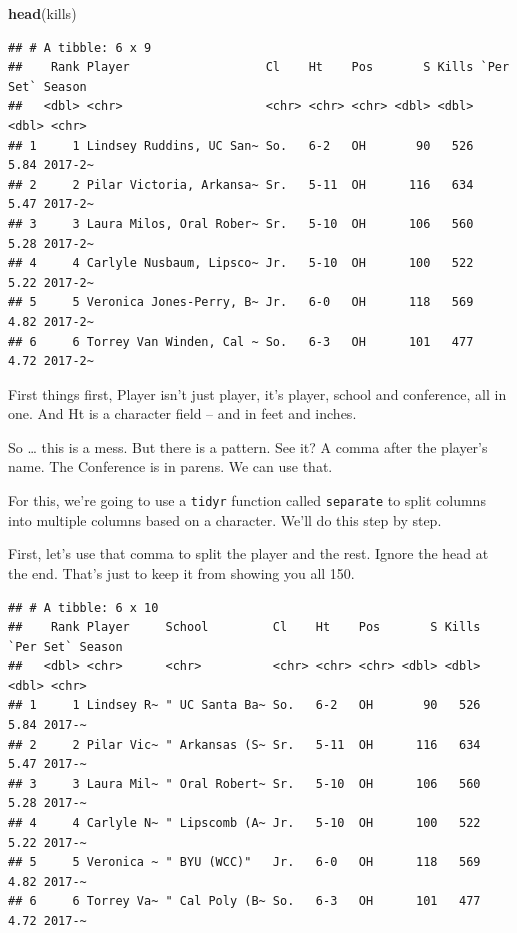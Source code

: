 \documentclass[]{book}
\newenvironment{Shaded}{\begin{snugshade}}{\end{snugshade}}
\newcommand{\DataTypeTok}[1]{\textcolor[rgb]{0.13,0.29,0.53}{#1}}
\newcommand{\KeywordTok}[1]{\textcolor[rgb]{0.13,0.29,0.53}{\textbf{#1}}}
\newcommand{\NormalTok}[1]{#1}
\newcommand{\OperatorTok}[1]{\textcolor[rgb]{0.81,0.36,0.00}{\textbf{#1}}}
\newcommand{\StringTok}[1]{\textcolor[rgb]{0.31,0.60,0.02}{#1}}
\begin{document}
\begin{Shaded}
\begin{Highlighting}[]
\KeywordTok{head}\NormalTok{(kills)}
\end{Highlighting}
\end{Shaded}

\begin{verbatim}
## # A tibble: 6 x 9
##    Rank Player                   Cl    Ht    Pos       S Kills `Per Set` Season 
##   <dbl> <chr>                    <chr> <chr> <chr> <dbl> <dbl>     <dbl> <chr>  
## 1     1 Lindsey Ruddins, UC San~ So.   6-2   OH       90   526      5.84 2017-2~
## 2     2 Pilar Victoria, Arkansa~ Sr.   5-11  OH      116   634      5.47 2017-2~
## 3     3 Laura Milos, Oral Rober~ Sr.   5-10  OH      106   560      5.28 2017-2~
## 4     4 Carlyle Nusbaum, Lipsco~ Jr.   5-10  OH      100   522      5.22 2017-2~
## 5     5 Veronica Jones-Perry, B~ Jr.   6-0   OH      118   569      4.82 2017-2~
## 6     6 Torrey Van Winden, Cal ~ So.   6-3   OH      101   477      4.72 2017-2~
\end{verbatim}

First things first, Player isn't just player, it's player, school and conference, all in one. And Ht is a character field -- and in feet and inches.

So \ldots{} this is a mess. But there is a pattern. See it? A comma after the player's name. The Conference is in parens. We can use that.

For this, we're going to use a \texttt{tidyr} function called \texttt{separate} to split columns into multiple columns based on a character. We'll do this step by step.

First, let's use that comma to split the player and the rest. Ignore the head at the end. That's just to keep it from showing you all 150.

\begin{Shaded}
\end{Shaded}

\begin{verbatim}
## # A tibble: 6 x 10
##    Rank Player     School         Cl    Ht    Pos       S Kills `Per Set` Season
##   <dbl> <chr>      <chr>          <chr> <chr> <chr> <dbl> <dbl>     <dbl> <chr> 
## 1     1 Lindsey R~ " UC Santa Ba~ So.   6-2   OH       90   526      5.84 2017-~
## 2     2 Pilar Vic~ " Arkansas (S~ Sr.   5-11  OH      116   634      5.47 2017-~
## 3     3 Laura Mil~ " Oral Robert~ Sr.   5-10  OH      106   560      5.28 2017-~
## 4     4 Carlyle N~ " Lipscomb (A~ Jr.   5-10  OH      100   522      5.22 2017-~
## 5     5 Veronica ~ " BYU (WCC)"   Jr.   6-0   OH      118   569      4.82 2017-~
## 6     6 Torrey Va~ " Cal Poly (B~ So.   6-3   OH      101   477      4.72 2017-~
\end{verbatim}
\end{document}

